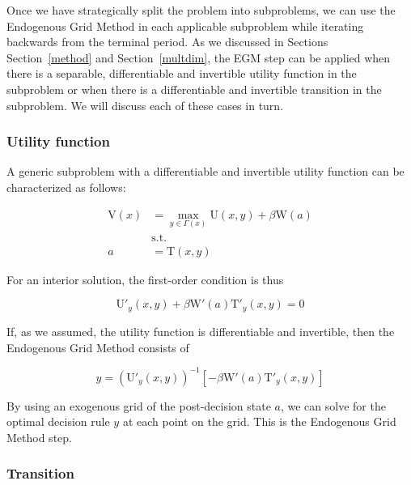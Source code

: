 \documentclass{article}
\newcommand{\DiscFac}{\beta}
\newcommand{\VFunc}{\mathrm{V}}
\newcommand{\PGro}{\Gamma}
\newcommand{\aRat}{a}
\newcommand{\xRat}{x}
\newcommand{\TFunc}{\mathrm{T}}
\newcommand{\UFunc}{\mathrm{U}}
\newcommand{\WFunc}{\mathrm{W}}
\newcommand{\yRat}{y}
\begin{document}
Once we have strategically split the problem into subproblems, we can use the Endogenous Grid Method in each applicable subproblem while iterating backwards from the terminal period. As we discussed in Sections Section~\ref{method} and Section~\ref{multdim}, the EGM step can be applied when there is a separable, differentiable and invertible utility function in the subproblem or when there is a differentiable and invertible transition in the subproblem. We will discuss each of these cases in turn.

\subsubsection{Utility function}\label{Utility function}

A generic subproblem with a differentiable and invertible utility function can be characterized as follows:

\begin{equation}
\begin{split}
        \VFunc(\xRat) &  = \max_{\yRat  \in \PGro(\xRat)} \UFunc(\xRat, \yRat) + \DiscFac \WFunc(\aRat) \\
        & \text{s.t.} \\
        \aRat & = \TFunc(\xRat,\yRat)
    \end{split}
\end{equation}

For an interior solution, the first-order condition is thus

\begin{equation}
\UFunc'_{\yRat}(\xRat, \yRat) + \DiscFac \WFunc'(\aRat)\TFunc'_{\yRat}(\xRat,\yRat) = 0
\end{equation}

If, as we assumed, the utility function is differentiable and invertible, then the Endogenous Grid Method consists of

\begin{equation}
\yRat = \left(\UFunc'_{\yRat}(\xRat, \yRat)\right)^{-1} \left[ -\DiscFac \WFunc'(\aRat)\TFunc'_{\yRat}(\xRat,\yRat)\right]
\end{equation}

By using an exogenous grid of the post-decision state $\aRat$, we can solve for the optimal decision rule $\yRat$ at each point on the grid. This is the Endogenous Grid Method step.

\subsubsection{Transition}\label{Transition}
\end{document}
